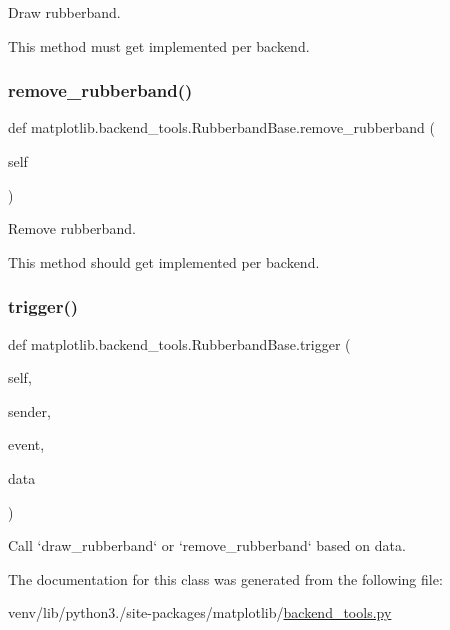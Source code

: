 \begin{DoxyVerb}Draw rubberband.

This method must get implemented per backend.
\end{DoxyVerb}
 \mbox{\label{classmatplotlib_1_1backend__tools_1_1RubberbandBase_aeae8c88c12e595eaa947bd7548ed05c2}} 
\subsubsection{\texorpdfstring{remove\+\_\+rubberband()}{remove\_rubberband()}}
{\footnotesize\ttfamily def matplotlib.\+backend\+\_\+tools.\+Rubberband\+Base.\+remove\+\_\+rubberband (\begin{DoxyParamCaption}\item[{}]{self }\end{DoxyParamCaption})}

\begin{DoxyVerb}Remove rubberband.

This method should get implemented per backend.
\end{DoxyVerb}
 \mbox{\label{classmatplotlib_1_1backend__tools_1_1RubberbandBase_af3efd51b006e17bdb154aa9b328f3c10}} 
\subsubsection{\texorpdfstring{trigger()}{trigger()}}
{\footnotesize\ttfamily def matplotlib.\+backend\+\_\+tools.\+Rubberband\+Base.\+trigger (\begin{DoxyParamCaption}\item[{}]{self,  }\item[{}]{sender,  }\item[{}]{event,  }\item[{}]{data }\end{DoxyParamCaption})}

\begin{DoxyVerb}Call `draw_rubberband` or `remove_rubberband` based on data.\end{DoxyVerb}
 

The documentation for this class was generated from the following file\+:\begin{DoxyCompactItemize}
\item 
venv/lib/python3./site-\/packages/matplotlib/\hyperlink{backend__tools_8py}{backend\+\_\+tools.\+py}\end{DoxyCompactItemize}
